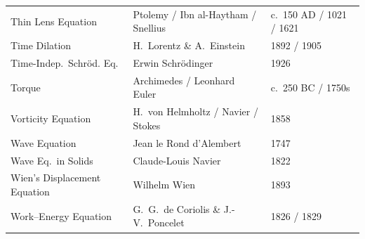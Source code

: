 \documentclass[11pt,openright]{book}
\begin{document}
\begin{longtable}{p{6cm}p{6cm}p{2.5cm}}
Thin Lens Equation & Ptolemy / Ibn al-Haytham / Snellius & c.\ 150 AD / 1021 / 1621 \\
Time Dilation & H.\ Lorentz \& A.\ Einstein & 1892 / 1905 \\
Time-Indep.\ Schr\"od. Eq. & Erwin Schr\"odinger & 1926 \\
Torque & Archimedes / Leonhard Euler & c.\ 250 BC / 1750s \\
Vorticity Equation & H.\ von Helmholtz / Navier / Stokes & 1858 \\
Wave Equation & Jean le Rond d'Alembert & 1747 \\
Wave Eq.\ in Solids & Claude-Louis Navier & 1822 \\
Wien's Displacement Equation & Wilhelm Wien & 1893 \\
Work--Energy Equation & G.\ G.\ de Coriolis \& J.-V.\ Poncelet & 1826 / 1829 \\
\end{longtable}
\end{document}
